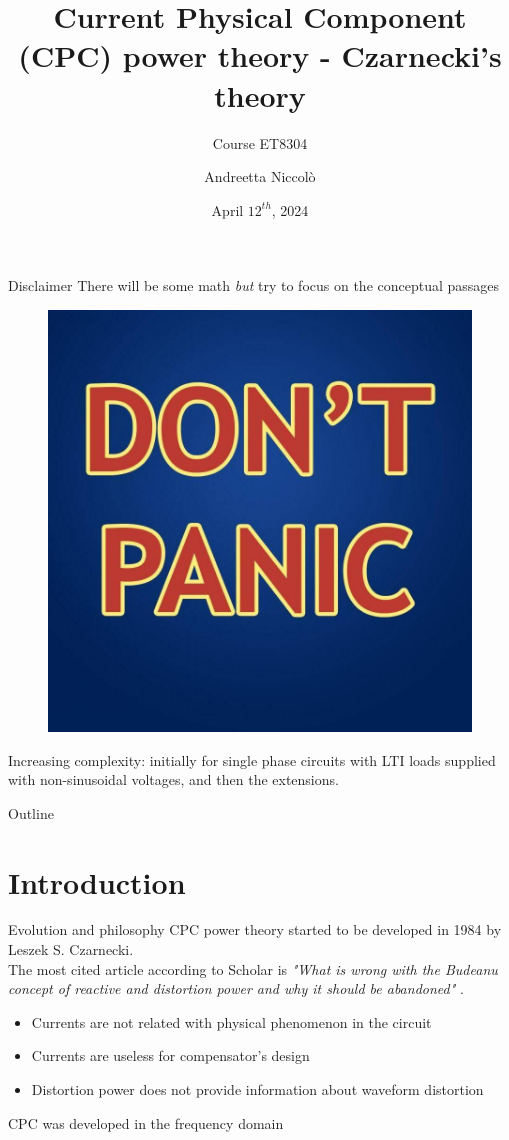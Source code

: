 \documentclass[aspectratio=169]{beamer}
\title{Current Physical Component (CPC) power theory - Czarnecki's theory}
\subtitle{Course ET8304}
\author{Andreetta Niccolò}
\date{April $12^{th}$, 2024}
\begin{document}
  \maketitle

  \begin{frame}{Disclaimer}
  There will be some math \textit{but} try to focus on the conceptual passages
      \begin{figure}
          \centering
          \includegraphics[width=0.3\columnwidth]{dontpanic.jpg}
      \end{figure}
      \textcolor{NTNU_orange}{Increasing complexity}: initially for single phase circuits with LTI loads supplied with non-sinusoidal voltages, and then the extensions.\\
        
  \end{frame}

  \begin{frame}[fragile]{Outline}
    \tableofcontents
  \end{frame}

  \section{Introduction}
  \begin{frame}{Evolution and philosophy}{\insertsection}
        CPC power theory started to be developed in \textcolor{NTNU_orange}{1984} by Leszek S. Czarnecki.\\
        The most cited article according to Scholar is \textit{"What is wrong with the Budeanu concept of reactive and distortion power and why it should be abandoned"} \cite{6312797}.
        \begin{itemize}
            \item Currents are not related with physical phenomenon in the circuit
            \item Currents are useless for compensator's design
            \item Distortion power does not provide information about waveform distortion
        \end{itemize}

        CPC was developed in the \textcolor{NTNU_orange}{frequency domain}
  \end{frame}
\end{document}
